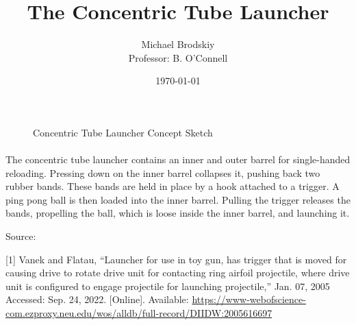 


\title{The Concentric Tube Launcher}
\date{\today}
\author{Michael Brodskiy\\ \small Professor: B. O'Connell}



\maketitle

\begin{figure}[h!]
  \centering
  
  \caption{Concentric Tube Launcher Concept Sketch}
  \label{fig:1}
\end{figure}

\paragraph{} The concentric tube launcher contains an inner and outer barrel for single-handed reloading. Pressing down on the inner barrel collapses it, pushing back two rubber bands. These bands are held in place by a hook attached to a trigger. A ping pong ball is then loaded into the inner barrel. Pulling the trigger releases the bands, propelling the ball, which is loose inside the inner barrel, and launching it.

\newline
\vspace{25pt}

Source:

[1] Vanek and Flatau, “Launcher for use in toy gun, has trigger that is moved for causing drive to rotate drive unit for contacting ring airfoil projectile, where drive unit is configured to engage projectile for launching projectile,” Jan. 07, 2005 Accessed: Sep. 24, 2022. [Online]. Available: \href{https://www-webofscience-com.ezproxy.neu.edu/wos/alldb/full-record/DIIDW:2005616697}{https://www-webofscience-com.ezproxy.neu.edu/wos/alldb/full-record/DIIDW:2005616697}




